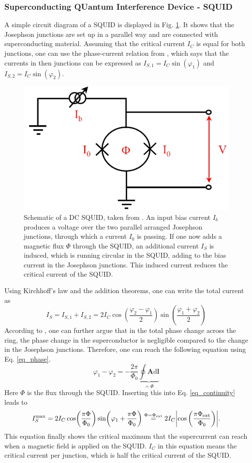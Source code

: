 \documentclass[a4paper,10pt]{article}
\newcommand{\dif}{\mathrm{d}}
\begin{document}
\subsubsection*{Superconducting QUantum Interference Device - SQUID}
A simple circuit diagram of a SQUID is displayed in Fig. \ref{fig_squid}. It shows that the Josephson junctions are set up in a parallel way and are connected with superconducting material. Assuming that the critical current $I_C$ is equal for both junctions, one can use the phase-current relation from \cite{grossmarx}, which says that the currents in then junctions can be expressed as $I_{S,1}=I_C \sin(\varphi_1)$ and $I_{S,2} = I_C \sin(\varphi_2)$.
\begin{figure}[htp!]
    \centering
    \includegraphics[width = 0.6 \textwidth]{SQUID_IV.jpg}
    \caption{Schematic of a DC SQUID, taken from \cite{squid_circuit}. An input bias current $I_b$ produces a voltage over the two parallel arranged Josephson junctions, through which a current $I_0$ is passing. If one now adds a magnetic flux $\Phi$ through the SQUID, an additional current $I_S$ is induced, which is running circular in the SQUID, adding to the bias current in the Josephson junctions. This induced current reduces the critical current of the SQUID.}
    \label{fig_squid}
\end{figure}
Using Kirchhoff's law and the addition theorems, one can write the total current as 
\begin{equation}
    \label{eq_continuity}
    I_S = I_{S,1} + I_{S,2} = 2 I_C \cos(\frac{\varphi_2 - \varphi_1}{2}) \sin(\frac{\varphi_1 + \varphi_2}{2})
\end{equation}
According to \cite{grossmarx}, one can further argue that in the total phase change across the ring, the phase change in the superconductor is negligible compared to the change in the Josephson junctions. Therefore, one can reach the following equation using Eq. \ref{eq_phase}. 
\begin{equation}
    \varphi_1 - \varphi_2 = - \frac{2 \pi}{\Phi_0} \underbrace{ \oint \mathbf{A} \dif \mathbf{l} }_{= \Phi}
\end{equation}
Here $\Phi$ is the flux through the SQUID. Inserting this into Eq. \ref{eq_continuity} leads to 
\begin{equation}
    I_S^\mathrm{max} = 2 I_C \cos(\frac{\pi \Phi}{\Phi_0}) \sin(\varphi_1 + \frac{\pi \Phi}{\Phi_0}) \stackrel{\Phi = \Phi_\mathrm{ext}}{=} 2 I_C \abs{\cos \left( \frac{\pi \Phi_\mathrm{ext}}{\Phi_0} \right)}.
\end{equation}
This equation finally shows the critical maximum that the supercurrent can reach when a magnetic field is applied on the SQUID. $I_C$ in this equation means the critical current per junction, which is half the critical current of the SQUID. 
\end{document}

